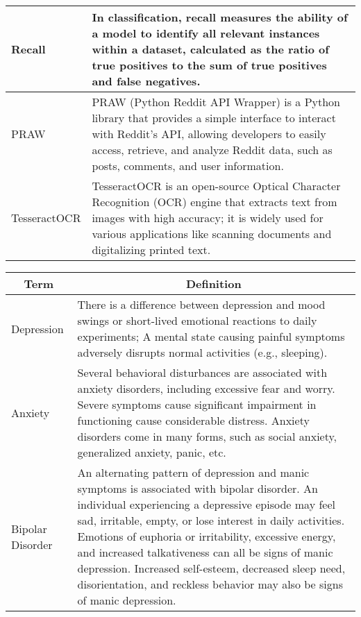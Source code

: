 \begin{center}
\begin{tabular}{|p{4cm}|p{10cm}|}
  \hline
  Recall & In classification, recall measures the ability of a model to identify all relevant instances within a dataset, calculated as the ratio of true positives to the sum of true positives and false negatives. \\
  
  \hline
  PRAW & PRAW (Python Reddit API Wrapper) is a Python library that provides a simple interface to interact with Reddit's API, allowing developers to easily access, retrieve, and analyze Reddit data, such as posts, comments, and user information. \\

  \hline
  TesseractOCR & TesseractOCR is an open-source Optical Character Recognition (OCR) engine that extracts text from images with high accuracy; it is widely used for various applications like scanning documents and digitalizing printed text. \\
  \hline

\end{tabular}

\pagebreak

\begin{tabular}{|p{4cm}|p{10cm}|}
  \hline
  \multicolumn{1}{|c|}{\textbf{Term}} & \multicolumn{1}{c|}{\textbf{Definition}} \\

  \hline
  Depression & There is a difference between depression and mood swings or short-lived emotional reactions to daily experiments; A mental state causing painful symptoms adversely disrupts normal activities (e.g., sleeping). \\

  \hline
  Anxiety & Several behavioral disturbances are associated with anxiety disorders, including excessive fear and worry. Severe symptoms cause significant impairment in functioning cause considerable distress. Anxiety disorders come in many forms, such as social anxiety, generalized anxiety, panic, etc. \\

  \hline
  Bipolar Disorder & An alternating pattern of depression and manic symptoms is associated with bipolar disorder. An individual experiencing a depressive episode may feel sad, irritable, empty, or lose interest in daily activities. Emotions of euphoria or irritability, excessive energy, and increased talkativeness can all be signs of manic depression. Increased self-esteem, decreased sleep need, disorientation, and reckless behavior may also be signs of manic depression. \\


\end{tabular}
\end{center}
